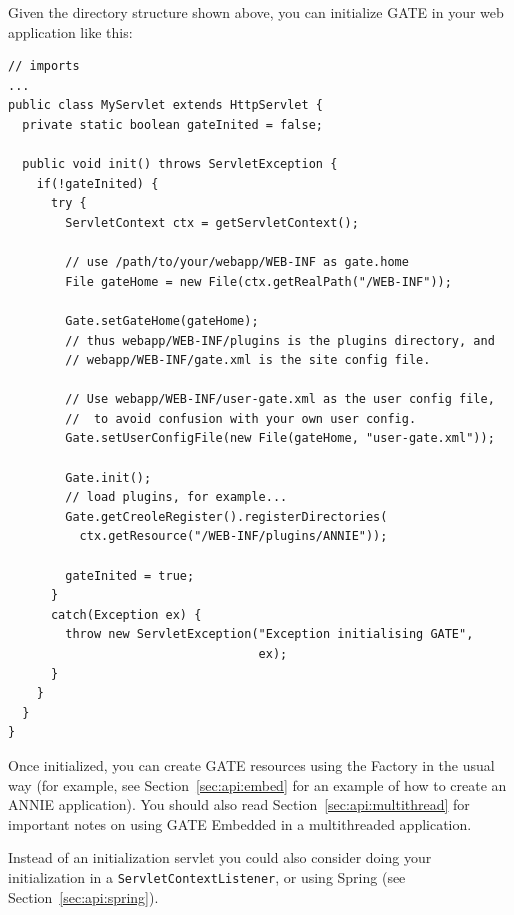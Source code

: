 Given the directory structure shown above, you can initialize GATE in your web
application like this:
\begin{lstlisting}
// imports
...
public class MyServlet extends HttpServlet {
  private static boolean gateInited = false;

  public void init() throws ServletException {
    if(!gateInited) {
      try {
        ServletContext ctx = getServletContext();

        // use /path/to/your/webapp/WEB-INF as gate.home
        File gateHome = new File(ctx.getRealPath("/WEB-INF"));
        
        Gate.setGateHome(gateHome);
        // thus webapp/WEB-INF/plugins is the plugins directory, and
        // webapp/WEB-INF/gate.xml is the site config file.

        // Use webapp/WEB-INF/user-gate.xml as the user config file,
        //  to avoid confusion with your own user config.
        Gate.setUserConfigFile(new File(gateHome, "user-gate.xml"));

        Gate.init();
        // load plugins, for example...
        Gate.getCreoleRegister().registerDirectories(
          ctx.getResource("/WEB-INF/plugins/ANNIE"));

        gateInited = true;
      }
      catch(Exception ex) {
        throw new ServletException("Exception initialising GATE",
                                   ex);
      }
    }
  }
}
\end{lstlisting}

Once initialized, you can create GATE resources using the Factory in
the usual way (for example, see Section~\ref{sec:api:embed} for an
example of how to create an ANNIE application).  You should also read
Section~\ref{sec:api:multithread} for important notes on using GATE
Embedded in a multithreaded application.

Instead of an initialization servlet you could also consider doing your
initialization in a \texttt{ServletContextListener}, or using Spring (see
Section~\ref{sec:api:spring}).


